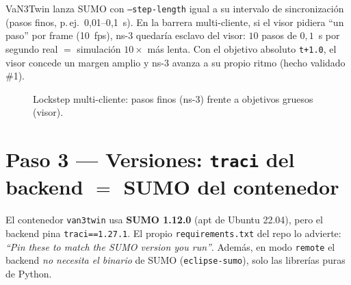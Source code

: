 \documentclass[11pt,a4paper]{article}
\begin{document}
VaN3Twin lanza SUMO con \texttt{--step-length} igual a su intervalo de sincronización
(pasos finos, p.\,ej.\ 0{,}01--0{,}1~s). En la barrera multi-cliente, si el visor pidiera
``un paso'' por frame (10~fps), ns-3 quedaría esclavo del visor: $10$ pasos de $0{,}1$~s
por segundo real $=$ simulación $10\times$ más lenta. Con el objetivo absoluto
\texttt{t+1.0}, el visor concede un margen amplio y ns-3 avanza a su propio ritmo
(hecho validado \#1).

\begin{figure}[h]
\centering
{}
\caption{Lockstep multi-cliente: pasos finos (ns-3) frente a objetivos gruesos (visor).}
\label{fig:lockstep}
\end{figure}

\section{Paso 3 — Versiones: \texttt{traci} del backend $=$ SUMO del contenedor}

El contenedor \texttt{van3twin} usa \textbf{SUMO 1.12.0} (apt de Ubuntu 22.04), pero el
backend pina \texttt{traci==1.27.1}. El propio \texttt{requirements.txt} del repo lo
advierte: \emph{``Pin these to match the SUMO version you run''}. Además, en modo
\texttt{remote} el backend \emph{no necesita el binario} de SUMO
(\texttt{eclipse-sumo}), solo las librerías puras de Python.
\end{document}
